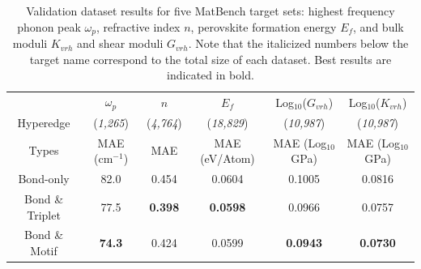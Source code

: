 \documentclass[10pt,a4paper,twocolumn]{article}
\begin{document}



\begin{table}\small
	\begin{tabular*}{\textwidth}{@{\extracolsep{\fill}}cccccc}
		\hline 
		$\quad$ & $\omega_p$  & $n$  & $E_f$  & Log$_{10}$($G_{vrh}$) & Log$_{10}$($K_{vrh}$) \\
		Hyperedge & (\textit{1,265}) &  (\textit{4,764}) & (\textit{18,829}) & (\textit{10,987}) & (\textit{10,987}) \\
		Types & MAE (cm$^{-1}$) & MAE & MAE (eV/Atom)& MAE (Log$_{10}$GPa)& MAE (Log$_{10}$GPa)  \\
		\hline
		Bond-only & 82.0& 0.454 & 0.0604 & 0.1005 & 0.0816\\
		Bond \& Triplet & 77.5& \textbf{0.398} & \textbf{0.0598} & 0.0966 & 0.0757 \\
		Bond \& Motif & \textbf{74.3}& 0.424 & 0.0599 & \textbf{0.0943} & \textbf{0.0730}\\
		\hline
	\end{tabular*}
	\caption{Validation dataset results for five MatBench target sets: highest frequency phonon peak $\omega_p$, refractive index $n$, perovskite formation energy $E_f$, and bulk moduli $K_{vrh}$ and shear moduli $G_{vrh}$. Note that the italicized numbers below the target name correspond to the total size of each dataset. Best results are indicated in bold.}\label{fig:matbench_table}
\end{table}
\end{document}
